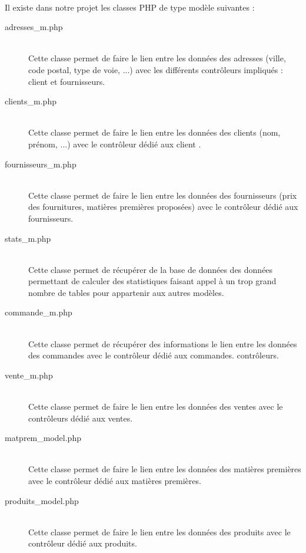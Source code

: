     \paragraph{}
        Il existe dans notre projet les classes PHP de type modèle suivantes :
        \begin{description}
            \item[adresses\_m.php]\hfill \\
                Cette classe permet de faire le lien entre les données des
                adresses (ville, code postal, type de voie, ...) avec les
                différents contrôleurs impliqués : client et fournisseurs.
            \item[clients\_m.php]\hfill \\
                Cette classe permet de faire le lien entre les données des
                clients (nom, prénom, ...) avec le contrôleur dédié aux client
                .
            \item[fournisseurs\_m.php]\hfill \\
                Cette classe permet de faire le lien entre les données des
                fournisseurs (prix des fournitures, matières premières
                proposées) avec le contrôleur dédié aux fournisseurs.
            \item[stats\_m.php]\hfill \\
                Cette classe permet de récupérer de la base de données des
                données permettant de calculer des statistiques faisant appel
                à un trop grand nombre de tables pour appartenir aux autres
                modèles.
            \item[commande\_m.php]\hfill \\
                Cette classe permet de récupérer des informations le lien
                entre les données des commandes avec le contrôleur dédié aux
                commandes. contrôleurs.
            \item[vente\_m.php]\hfill \\
                Cette classe permet de faire le lien entre les données des
                ventes avec le contrôleurs dédié aux ventes.
            \item[matprem\_model.php]\hfill \\
                Cette classe permet de faire le lien entre les données des
                matières premières avec le contrôleur dédié aux matières
                premières.
            \item[produits\_model.php]\hfill \\
                Cette classe permet de faire le lien entre les données des
                produits avec le contrôleur dédié aux produits.
        \end{description}


